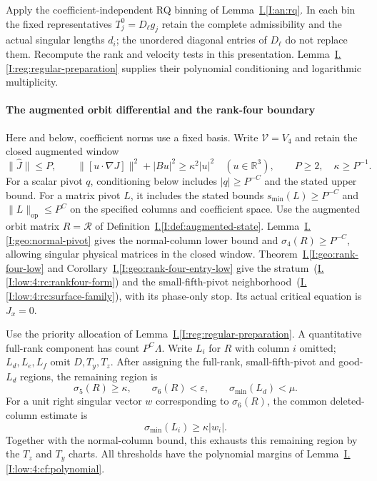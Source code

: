 \documentclass[11pt]{amsart}
\theoremstyle{definition}
\theoremstyle{remark}
\numberwithin{equation}{section}
\newcommand{\partIref}[1]{\hyperref[I:#1]{I.\ref*{I:#1}}}
\newcommand{\partIeqref}[1]{\textup{(\partIref{#1})}}
\begin{document}
Apply the coefficient-independent RQ binning of Lemma~\partIref{an:rq}. In each bin the fixed representatives $T_j^0=D_\ell g_j$ retain the complete admissibility and the actual singular lengths $d_i$; the unordered diagonal entries of $D_\ell$ do not replace them. Recompute the rank and velocity tests in this presentation. Lemma~\partIref{reg:regular-preparation} supplies their polynomial conditioning and logarithmic multiplicity.

\paragraph{The augmented orbit differential and the rank-four boundary}

Here and below, coefficient norms use a fixed basis. Write $\mathcal V=V_4$ and retain the closed augmented window
\begin{equation}\label{low:4:rc:stop}
\|\widehat J\|\le P,\qquad \|[u\cdot\nabla J]\|^2+|Bu|^2\ge\kappa^2|u|^2\quad(u\in\mathbb R^3),\qquad P\ge2,\quad\kappa\ge P^{-1}.
\end{equation}
For a scalar pivot $q$, conditioning below includes $|q|\ge P^{-C}$ and the stated upper bound. For a matrix pivot $L$, it includes the stated bounds $s_{\min}(L)\ge P^{-C}$ and $\|L\|_{\mathrm{op}}\le P^C$ on the specified columns and coefficient space. Use the augmented orbit matrix $R=\mathcal R$ of Definition~\partIref{def:augmented-state}. Lemma~\partIref{geo:normal-pivot} gives the normal-column lower bound and $\sigma_4(R)\ge P^{-C}$, allowing singular physical matrices in the closed window. Theorem~\partIref{geo:rank-four-low} and Corollary~\partIref{geo:rank-four-entry-low} give the stratum~\partIeqref{low:4:rc:rankfour-form} and the small-fifth-pivot neighborhood~\partIeqref{low:4:rc:surface-family}, with its phase-only stop. Its actual critical equation is $J_x=0$.

Use the priority allocation of Lemma~\partIref{reg:regular-preparation}. A quantitative full-rank component has count $P^C\Lambda$. Write $L_i$ for $R$ with column $i$ omitted; $L_d,L_e,L_f$ omit $D,T_y,T_z$. After assigning the full-rank, small-fifth-pivot and good-$L_d$ regions, the remaining region is
\begin{equation}\label{low:4:cf:envelope}
\sigma_5(R)\ge\kappa,\qquad \sigma_6(R)<\varepsilon,\qquad \sigma_{\min}(L_d)<\mu.
\end{equation}
For a unit right singular vector $w$ corresponding to $\sigma_6(R)$, the common deleted-column estimate is
\begin{equation}\label{low:4:cf:delete}
\sigma_{\min}(L_i)\ge\kappa|w_i|.
\end{equation}
Together with the normal-column bound, this exhausts this remaining region by the $T_z$ and $T_y$ charts. All thresholds have the polynomial margins of Lemma~\partIref{low:4:cf:polynomial}.
\end{document}
